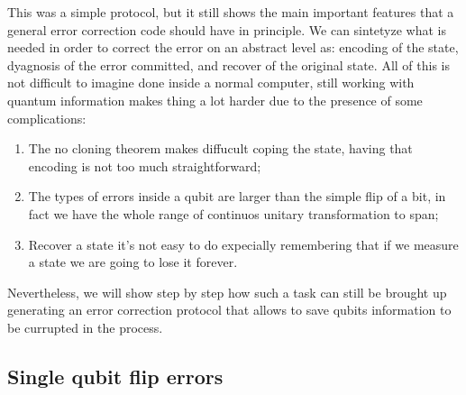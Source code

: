 This was a simple protocol, but it still shows the main important features that a general error correction code should have in principle. We can sintetyze what is needed in order to correct the error on an abstract level as: encoding of the state, dyagnosis of the error committed, and recover of the original state. All of this is not difficult to imagine done inside a normal computer, still working with quantum information makes thing a lot harder due to the presence of some complications:
\begin{enumerate}[label*=\protect\fbox{\arabic{enumi}}]
    \item The no cloning theorem makes diffucult coping the state, having that encoding is not too much straightforward;
    \item The types of errors inside a qubit are larger than the simple flip of a bit, in fact we have the whole range of continuos unitary transformation to span;
    \item Recover a state it's not easy to do expecially remembering that if we measure a state we are going to lose it forever.
\end{enumerate}
Nevertheless, we will show step by step how such a task can still be brought up generating an error correction protocol that allows to save qubits information to be currupted in the process.

\subsection{Single qubit flip errors}

